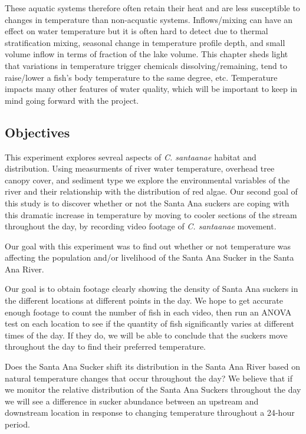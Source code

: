 \documentclass{article}\usepackage[]{graphicx}\usepackage[]{color}
\begin{document}
These aquatic systems therefore often retain their heat and are less susceptible to changes in temperature than non-acquatic systems. Inflows/mixing can have an effect on water temperature but it is often hard to detect due to thermal stratification mixing, seasonal change in temperature profile depth, and small volume inflow in terms of fraction of the lake volume. This chapter sheds light that variations in temperature trigger chemicals dissolving/remaining, tend to raise/lower a fish's body temperature to the same degree, etc. Temperature impacts many other features of water quality, which will be important to keep in mind going forward with the project.


\subsection{Objectives}
This experiment explores sevreal aspects of \emph{C. santaanae} habitat and distribution. Using measurments of river water temperature, overhead tree canopy cover, and sediment type we explore the environmental variables of the river and their relationship with the distribution of red algae. Our second goal of this study is to discover whether or not the Santa Ana suckers are coping with this dramatic increase in temperature by moving to cooler sections of the stream throughout the day, by recording video footage of \emph{C. santaanae} movement. 

Our goal with this experiment was to find out whether or not temperature was affecting the population and/or livelihood of the Santa Ana Sucker in the Santa Ana River.

Our goal is to obtain footage clearly showing the density of Santa Ana suckers in the different locations at different points in the day.  We hope to get accurate enough footage to count the number of fish in each video, then run an ANOVA test on each location to see if the quantity of fish significantly varies at different times of the day.  If they do, we will be able to conclude that the suckers move throughout the day to find their preferred temperature.

Does the Santa Ana Sucker shift its distribution in the Santa Ana River based on natural temperature changes that occur throughout the day? We believe that if we monitor the relative distribution of the Santa Ana Suckers throughout the day we will see a difference in sucker abundance between an upstream and downstream location in response to changing temperature throughout a 24-hour period.
\end{document}
